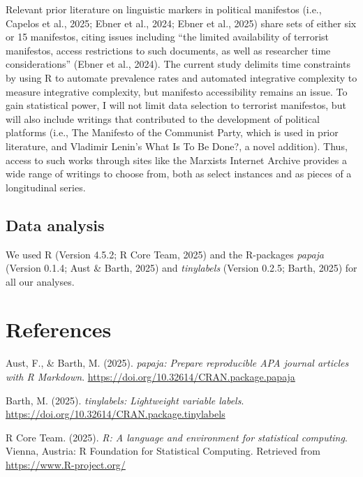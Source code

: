 \documentclass[
  english,
  man]{apa6}
\newlength{\cslhangindent}
\newenvironment{CSLReferences}[2] %
 {\begin{list}{}{%
  \setlength{\itemindent}{0pt}
  \setlength{\leftmargin}{0pt}
  \setlength{\parsep}{0pt}
  \ifodd #1
   \setlength{\leftmargin}{\cslhangindent}
   \setlength{\itemindent}{-1\cslhangindent}
  \fi
  \setlength{\itemsep}{#2\baselineskip}}}
 {\end{list}}
\begin{document}
Relevant prior literature on linguistic markers in political manifestos (i.e., Capelos et
al., 2025; Ebner et al., 2024; Ebner et al., 2025) share sets of either six or 15
manifestos, citing issues including ``the limited availability of terrorist manifestos,
access restrictions to such documents, as well as researcher time considerations'' (Ebner et
al., 2024). The current study delimits time constraints by using R to automate prevalence
rates and automated integrative complexity to measure integrative complexity, but manifesto
accessibility remains an issue. To gain statistical power, I will not limit data selection
to terrorist manifestos, but will also include writings that contributed to the development
of political platforms (i.e., The Manifesto of the Communist Party, which is used in prior
literature, and Vladimir Lenin's What Is To Be Done?, a novel addition). Thus, access to
such works through sites like the Marxists Internet Archive provides a wide range of
writings to choose from, both as select instances and as pieces of a longitudinal series.

\subsection{Data analysis}\label{data-analysis}

We used R (Version 4.5.2; R Core Team, 2025) and the R-packages \emph{papaja} (Version 0.1.4; Aust \& Barth, 2025) and \emph{tinylabels} (Version 0.2.5; Barth, 2025) for all our analyses.

\newpage

\section{References}\label{references}

\label{refs}
\begin{CSLReferences}{1}{0}
Aust, F., \& Barth, M. (2025). \emph{{papaja}: {Prepare} reproducible {APA} journal articles with {R Markdown}}. \url{https://doi.org/10.32614/CRAN.package.papaja}

Barth, M. (2025). \emph{{tinylabels}: Lightweight variable labels}. \url{https://doi.org/10.32614/CRAN.package.tinylabels}

R Core Team. (2025). \emph{R: A language and environment for statistical computing}. Vienna, Austria: R Foundation for Statistical Computing. Retrieved from \url{https://www.R-project.org/}

\end{CSLReferences}
\end{document}
